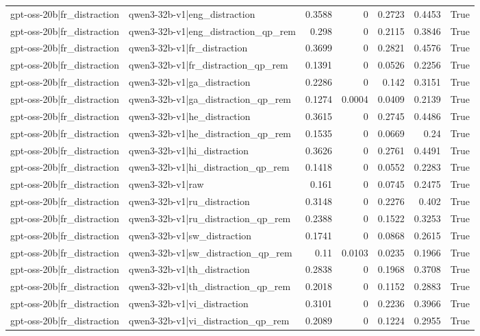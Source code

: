 \begin{table}
\begin{tabular}{l l r r r r l}
gpt-oss-20b|fr_distraction & qwen3-32b-v1|eng_distraction & 0.3588 & 0 & 0.2723 & 0.4453 & True \\
gpt-oss-20b|fr_distraction & qwen3-32b-v1|eng_distraction_qp_rem & 0.298 & 0 & 0.2115 & 0.3846 & True \\
gpt-oss-20b|fr_distraction & qwen3-32b-v1|fr_distraction & 0.3699 & 0 & 0.2821 & 0.4576 & True \\
gpt-oss-20b|fr_distraction & qwen3-32b-v1|fr_distraction_qp_rem & 0.1391 & 0 & 0.0526 & 0.2256 & True \\
gpt-oss-20b|fr_distraction & qwen3-32b-v1|ga_distraction & 0.2286 & 0 & 0.142 & 0.3151 & True \\
gpt-oss-20b|fr_distraction & qwen3-32b-v1|ga_distraction_qp_rem & 0.1274 & 0.0004 & 0.0409 & 0.2139 & True \\
gpt-oss-20b|fr_distraction & qwen3-32b-v1|he_distraction & 0.3615 & 0 & 0.2745 & 0.4486 & True \\
gpt-oss-20b|fr_distraction & qwen3-32b-v1|he_distraction_qp_rem & 0.1535 & 0 & 0.0669 & 0.24 & True \\
gpt-oss-20b|fr_distraction & qwen3-32b-v1|hi_distraction & 0.3626 & 0 & 0.2761 & 0.4491 & True \\
gpt-oss-20b|fr_distraction & qwen3-32b-v1|hi_distraction_qp_rem & 0.1418 & 0 & 0.0552 & 0.2283 & True \\
gpt-oss-20b|fr_distraction & qwen3-32b-v1|raw & 0.161 & 0 & 0.0745 & 0.2475 & True \\
gpt-oss-20b|fr_distraction & qwen3-32b-v1|ru_distraction & 0.3148 & 0 & 0.2276 & 0.402 & True \\
gpt-oss-20b|fr_distraction & qwen3-32b-v1|ru_distraction_qp_rem & 0.2388 & 0 & 0.1522 & 0.3253 & True \\
gpt-oss-20b|fr_distraction & qwen3-32b-v1|sw_distraction & 0.1741 & 0 & 0.0868 & 0.2615 & True \\
gpt-oss-20b|fr_distraction & qwen3-32b-v1|sw_distraction_qp_rem & 0.11 & 0.0103 & 0.0235 & 0.1966 & True \\
gpt-oss-20b|fr_distraction & qwen3-32b-v1|th_distraction & 0.2838 & 0 & 0.1968 & 0.3708 & True \\
gpt-oss-20b|fr_distraction & qwen3-32b-v1|th_distraction_qp_rem & 0.2018 & 0 & 0.1152 & 0.2883 & True \\
gpt-oss-20b|fr_distraction & qwen3-32b-v1|vi_distraction & 0.3101 & 0 & 0.2236 & 0.3966 & True \\
gpt-oss-20b|fr_distraction & qwen3-32b-v1|vi_distraction_qp_rem & 0.2089 & 0 & 0.1224 & 0.2955 & True \\

\end{tabular}
\end{table}
